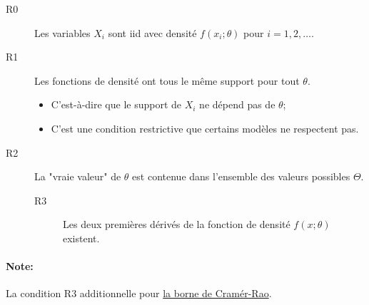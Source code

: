 \documentclass[10pt, french]{article}
\begin{document}
\begin{multicols*}{2}
\begin{definitionNOHFILLsub}
\begin{description}
	\item[R0]	Les variables $X_{i}$ sont iid avec densité $f(x_{i}; \theta)$ pour $i	=	1, 2, \dots$.
	\item[R1]	Les fonctions de densité ont tous le même support pour tout $\theta$.
		\begin{itemize}
		\item	C'est-à-dire que le support de $X_{i}$ ne dépend pas de $\theta$;
		\item	C'est une condition restrictive que certains modèles ne respectent pas.
		\end{itemize}
	\item[R2]	La "vraie valeur" de $\theta$ est contenue dans l'ensemble des valeurs possibles $\Theta$.
\tcbline
\begin{description}
	\item[R3]	Les deux premières dérivés de la fonction de densité $f(x; \theta)$ existent.
\end{description}
\end{description}
\paragraph{Note:}	La condition R3 additionnelle pour \hyperref[sec:cramer_rao]{\color{azure(colorwheel)}la borne de Cramér-Rao}.
\end{definitionNOHFILLsub}
	


\end{multicols*}
\end{document}

